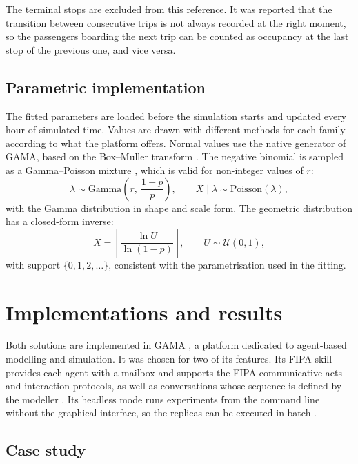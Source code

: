\documentclass[a4paper,fleqn]{cas-sc}
\begin{document}
The terminal stops are excluded from this reference. It was reported that the
transition between consecutive trips is not always recorded at the right
moment, so the passengers boarding the next trip can be counted as occupancy
at the last stop of the previous one, and vice versa.

\subsection{Parametric implementation}\label{sec:data_sampling}

The fitted parameters are loaded before the simulation starts and updated
every hour of simulated time. Values are drawn with different methods for each family
according to what the platform offers. Normal values use the native generator
of GAMA, based on the Box--Muller transform \cite{box1958}.
The negative binomial is sampled as a Gamma--Poisson mixture
\cite{devroye1986}, which is valid for non-integer values of $r$:
\begin{equation}\label{eq:negbin}
\lambda \sim \mathrm{Gamma}\!\left(r,\ \frac{1-p}{p}\right), \qquad
X \mid \lambda \sim \mathrm{Poisson}(\lambda),
\end{equation}
with the Gamma distribution in shape and scale form. The geometric
distribution has a closed-form inverse:
\begin{equation}\label{eq:geom}
X = \left\lfloor \frac{\ln U}{\ln(1-p)} \right\rfloor, \qquad
U \sim \mathcal{U}(0,1),
\end{equation}
with support $\{0, 1, 2, \dots\}$, consistent with the parametrisation used in
the fitting.


\section{Implementations and results}\label{sec:results}

Both solutions are implemented in GAMA \cite{taillandier2019gama}, a platform
dedicated to agent-based modelling and simulation. It was chosen for two of
its features. Its FIPA skill provides each agent with a mailbox and supports
the FIPA communicative acts and interaction protocols, as well as
conversations whose sequence is defined by the modeller \cite{gama_fipa}. Its
headless mode runs experiments from the command line without the graphical
interface, so the replicas can be executed in batch \cite{gama_headless}.


\subsection{Case study}
\end{document}
